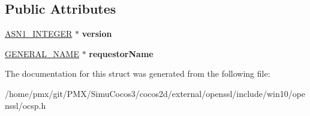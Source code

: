 \subsection*{Public Attributes}
\begin{DoxyCompactItemize}
\item 
\mbox{\label{structocsp__req__info__st_a945a047ebca6883967b717d6d39a5411}} 
\hyperlink{structasn1__string__st}{A\+S\+N1\+\_\+\+I\+N\+T\+E\+G\+ER} $\ast$ {\bfseries version}
\item 
\mbox{\label{structocsp__req__info__st_a6fd6c3850e1765a3e9a78b89c6d32f22}} 
\hyperlink{structGENERAL__NAME__st}{G\+E\+N\+E\+R\+A\+L\+\_\+\+N\+A\+ME} $\ast$ {\bfseries requestor\+Name}
\end{DoxyCompactItemize}


The documentation for this struct was generated from the following file\+:\begin{DoxyCompactItemize}
\item 
/home/pmx/git/\+P\+M\+X/\+Simu\+Cocos3/cocos2d/external/openssl/include/win10/openssl/ocsp.\+h\end{DoxyCompactItemize}
